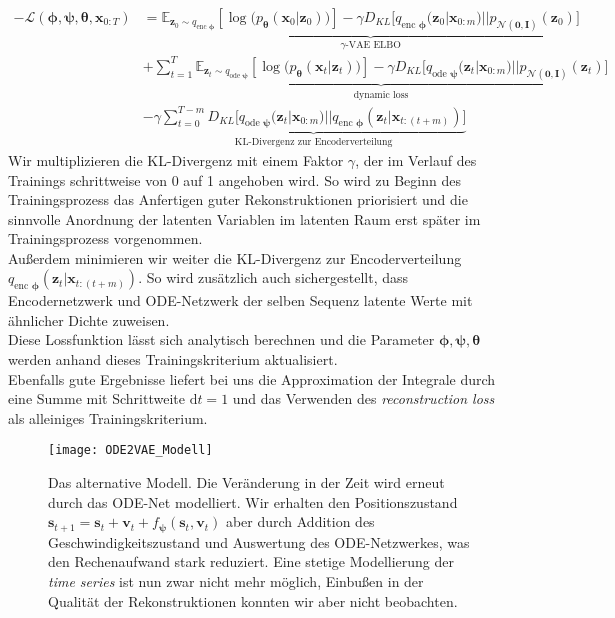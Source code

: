 \documentclass[12pt]{article}
\newcommand{\E}{\mathbb{E}}
\newcommand{\z}{\mathbf{z}}
\begin{document}
	\begin{align*}
	-\mathcal{L}(\boldsymbol\phi,\boldsymbol\psi,\boldsymbol\theta,\mathbf{x}_{0:T}) &=\underbrace{\E_{\mathbf{z}_{0}\sim q_{\text{enc }\boldsymbol\phi}}
		\left[\log\big(p_{\boldsymbol\theta}\left(\mathbf{x}_{0}|\mathbf{z}_{0}\right)\big)\right] - \gamma D_{KL}\big[q_{\text{enc }\boldsymbol\phi}(\mathbf{z}_{0}|\mathbf{x}_{0:m})||p_{\mathcal{N}(\mathbf{0},\mathbf{I})}(\z_0)\big]}_{\gamma\text{-VAE ELBO}}\\ &+ \underbrace{\sum_{t=1}^T \E_{\mathbf{z}_{t}\sim q_{\text{ode }\boldsymbol\psi}}
		\left[\log\big(p_{\boldsymbol\theta}\left(\mathbf{x}_{t}|\mathbf{z}_{t}\right)\big)\right] - \gamma D_{KL}\big[q_{\text{ode }\boldsymbol\psi}(\mathbf{z}_{t}|\mathbf{x}_{0:m})||p_{\mathcal{N}(\mathbf{0},\mathbf{I})}(\z_t)\big]}_{\text{dynamic loss}} \\ &- \gamma \underbrace{\sum_{t=0}^{T-m} D_{KL}\big[q_{\text{ode }\boldsymbol\psi}(\mathbf{z}_{t}|\mathbf{x}_{0:m})||q_{\text{enc }\boldsymbol\phi}(\mathbf{z}_{t}|\mathbf{x}_{t:(t+m)})\big]}_{\text{KL-Divergenz zur Encoderverteilung}}
	\end{align*}
	Wir multiplizieren die KL-Divergenz mit einem Faktor $\gamma$, der im Verlauf des Trainings schrittweise von 0 auf 1 angehoben wird. So wird zu Beginn des Trainingsprozess das Anfertigen guter Rekonstruktionen priorisiert und die sinnvolle
	Anordnung der latenten Variablen im latenten Raum erst später im Trainingsprozess vorgenommen.\\
	Außerdem minimieren wir weiter die KL-Divergenz zur Encoderverteilung $q_{\text{enc }\boldsymbol\phi}(\mathbf{z}_{t}|\mathbf{x}_{t:(t+m)})$. So wird zusätzlich auch sichergestellt, dass Encodernetzwerk und ODE-Netzwerk der selben Sequenz latente Werte mit ähnlicher Dichte zuweisen.\\
	Diese Lossfunktion lässt sich analytisch berechnen und die Parameter $\boldsymbol\phi,\boldsymbol\psi,\boldsymbol\theta$ werden anhand dieses Trainingskriterium aktualisiert.\\

	Ebenfalls gute Ergebnisse liefert bei uns die Approximation der Integrale durch eine Summe mit Schrittweite $\mathrm{d}t=1$ und das Verwenden des \emph{reconstruction loss} als alleiniges Trainingskriterium.\\
	\begin{figure}[htpb!]
		\centering
		\texttt{[image: ODE2VAE\_Modell]}
		\captionsetup{labelformat=empty}
		\caption{Das alternative Modell. Die Veränderung in der Zeit wird erneut durch das ODE-Net modelliert. Wir erhalten den Positionszustand $\mathbf{s}_{t+1} = \mathbf{s}_{t} + \mathbf{v}_{t} + f_{\boldsymbol\psi}(\mathbf{s}_{t}, \mathbf{v}_{t})$ aber durch Addition des Geschwindigkeitszustand und Auswertung des ODE-Netzwerkes, was den Rechenaufwand stark reduziert. Eine stetige Modellierung der \emph{time series} ist nun zwar nicht mehr möglich, Einbußen in der Qualität der Rekonstruktionen konnten wir aber nicht beobachten.}
	\end{figure}
\end{document}
